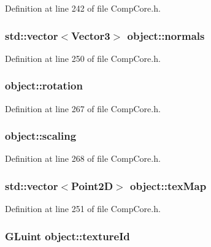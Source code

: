 Definition at line 242 of file Comp\-Core.\-h.

\hypertarget{structobject_a94599791d2212df04537a455d33e77d8}{
\subsubsection[{normals}]{\setlength{\rightskip}{0pt plus 5cm}std\-::vector$<${\bf Vector3}$>$ object\-::normals}}\label{structobject_a94599791d2212df04537a455d33e77d8}


Definition at line 250 of file Comp\-Core.\-h.

\hypertarget{structobject_aca33f4c591578298adeaedec0d354e9a}{
\subsubsection[{rotation}]{ object\-::rotation}}\label{structobject_aca33f4c591578298adeaedec0d354e9a}


Definition at line 267 of file Comp\-Core.\-h.

\hypertarget{structobject_a0d2429466fa7d9a13c1257cd043594c3}{
\subsubsection[{scaling}]{ object\-::scaling}}\label{structobject_a0d2429466fa7d9a13c1257cd043594c3}


Definition at line 268 of file Comp\-Core.\-h.

\hypertarget{structobject_ad7164f2aad0e32c7c33bc4aa2a31abd9}{
\subsubsection[{tex\-Map}]{\setlength{\rightskip}{0pt plus 5cm}std\-::vector$<${\bf Point2\-D}$>$ object\-::tex\-Map}}\label{structobject_ad7164f2aad0e32c7c33bc4aa2a31abd9}


Definition at line 251 of file Comp\-Core.\-h.

\hypertarget{structobject_a95c649f449cd461768418b5adfa4d3f2}{
\subsubsection[{texture\-Id}]{\setlength{\rightskip}{0pt plus 5cm}G\-Luint object\-::texture\-Id}}\label{structobject_a95c649f449cd461768418b5adfa4d3f2}


